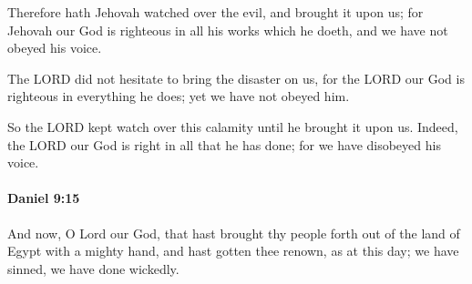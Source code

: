 			\begin{versebox}
					\item[BHS] 
					\item[LXX] 
					\item[ASV] Therefore hath Jehovah watched over the evil, and brought it upon us; for Jehovah our God is righteous in all his works which he doeth, and we have not obeyed his voice.
					\item[NIV] The LORD did not hesitate to bring the disaster on us, for the LORD our God is righteous in everything he does; yet we have not obeyed him.
					\item[NRSV] So the LORD kept watch over this calamity until he brought it upon us. Indeed, the LORD our God is right in all that he has done; for we have disobeyed his voice.
			\end{versebox}

		\paragraph{Daniel 9:15} %
			\label{DANIEL-9-15}

			And now, O Lord our God, that hast brought thy people forth out of the land of Egypt with a mighty hand, and hast gotten thee renown, as at this day; we have sinned, we have done wickedly.

